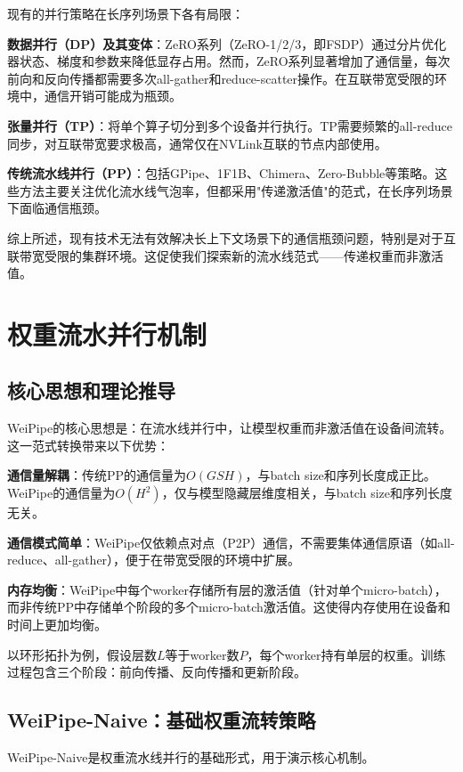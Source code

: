 现有的并行策略在长序列场景下各有局限：

\textbf{数据并行（DP）及其变体}：ZeRO系列（ZeRO-1/2/3，即FSDP）通过分片优化器状态、梯度和参数来降低显存占用。然而，ZeRO系列显著增加了通信量，每次前向和反向传播都需要多次all-gather和reduce-scatter操作。在互联带宽受限的环境中，通信开销可能成为瓶颈。

\textbf{张量并行（TP）}：将单个算子切分到多个设备并行执行。TP需要频繁的all-reduce同步，对互联带宽要求极高，通常仅在NVLink互联的节点内部使用。

\textbf{传统流水线并行（PP）}：包括GPipe、1F1B、Chimera、Zero-Bubble等策略。这些方法主要关注优化流水线气泡率，但都采用"传递激活值"的范式，在长序列场景下面临通信瓶颈。

综上所述，现有技术无法有效解决长上下文场景下的通信瓶颈问题，特别是对于互联带宽受限的集群环境。这促使我们探索新的流水线范式——传递权重而非激活值。

\section{权重流水并行机制}

\subsection{核心思想和理论推导}

WeiPipe的核心思想是：在流水线并行中，让模型权重而非激活值在设备间流转。这一范式转换带来以下优势：

\textbf{通信量解耦}：传统PP的通信量为$O(GSH)$，与batch size和序列长度成正比。WeiPipe的通信量为$O(H^2)$，仅与模型隐藏层维度相关，与batch size和序列长度无关。

\textbf{通信模式简单}：WeiPipe仅依赖点对点（P2P）通信，不需要集体通信原语（如all-reduce、all-gather），便于在带宽受限的环境中扩展。

\textbf{内存均衡}：WeiPipe中每个worker存储所有层的激活值（针对单个micro-batch），而非传统PP中存储单个阶段的多个micro-batch激活值。这使得内存使用在设备和时间上更加均衡。

以环形拓扑为例，假设层数$L$等于worker数$P$，每个worker持有单层的权重。训练过程包含三个阶段：前向传播、反向传播和更新阶段。

\subsection{WeiPipe-Naive：基础权重流转策略}

WeiPipe-Naive是权重流水线并行的基础形式，用于演示核心机制。

